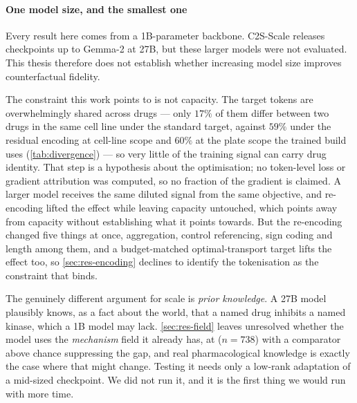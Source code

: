 \paragraph{One model size, and the smallest one} Every result here comes from a
1B-parameter backbone. C2S-Scale releases checkpoints up to Gemma-2 at 27B, but
these larger models were not evaluated. This thesis therefore does not establish
whether increasing model size improves counterfactual fidelity.

The constraint this work points to is not capacity. The target tokens are
overwhelmingly shared across drugs --- only $17\%$ of them differ between two
drugs in the same cell line under the standard target, against $59\%$ under the
residual encoding at cell-line scope and $60\%$ at the plate scope the trained
build uses (\cref{tab:divergence}) --- so very little of the training signal
can carry drug identity. That step is a hypothesis about the optimisation; no
token-level loss or gradient attribution was computed, so no fraction of the
gradient is claimed. A larger model receives the same diluted signal from the
same objective, and re-encoding lifted the effect while leaving
capacity untouched, which points away from capacity without establishing what it
points towards. But the re-encoding changed five things at once, aggregation,
control referencing, sign coding and length among them, and a budget-matched
optimal-transport target lifts the effect too, so \cref{sec:res-encoding}
declines to identify the tokenisation as the constraint that binds.

The genuinely different argument for scale is \emph{prior knowledge}. A 27B
model plausibly knows, as a fact about the world, that a named drug inhibits a
named kinase, which a 1B model may lack. \cref{sec:res-field} leaves
unresolved whether the model uses the \emph{mechanism} field it already has, at
 ($n = \num{738}$) with a comparator above chance
suppressing the gap, and real pharmacological knowledge is exactly the case
where that might change. Testing it needs only a low-rank adaptation of a
mid-sized checkpoint. We did not run it, and it is the first thing we would run
with more time.

